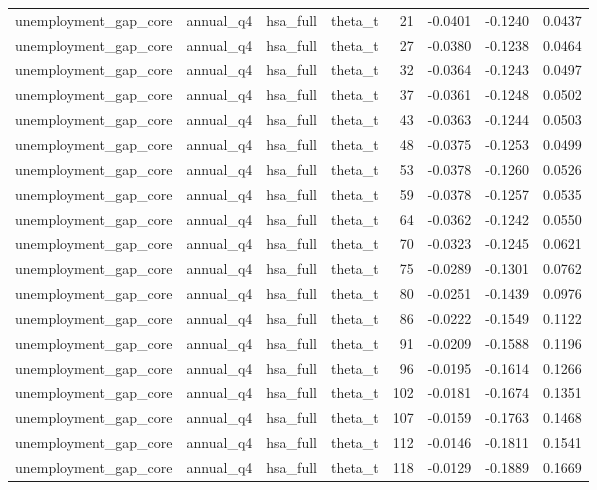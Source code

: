 \begin{tabular}{llllrrrr}
unemployment\_gap\_core & annual\_q4 & hsa\_full & theta\_t & 21 & -0.0401 & -0.1240 & 0.0437 \\
unemployment\_gap\_core & annual\_q4 & hsa\_full & theta\_t & 27 & -0.0380 & -0.1238 & 0.0464 \\
unemployment\_gap\_core & annual\_q4 & hsa\_full & theta\_t & 32 & -0.0364 & -0.1243 & 0.0497 \\
unemployment\_gap\_core & annual\_q4 & hsa\_full & theta\_t & 37 & -0.0361 & -0.1248 & 0.0502 \\
unemployment\_gap\_core & annual\_q4 & hsa\_full & theta\_t & 43 & -0.0363 & -0.1244 & 0.0503 \\
unemployment\_gap\_core & annual\_q4 & hsa\_full & theta\_t & 48 & -0.0375 & -0.1253 & 0.0499 \\
unemployment\_gap\_core & annual\_q4 & hsa\_full & theta\_t & 53 & -0.0378 & -0.1260 & 0.0526 \\
unemployment\_gap\_core & annual\_q4 & hsa\_full & theta\_t & 59 & -0.0378 & -0.1257 & 0.0535 \\
unemployment\_gap\_core & annual\_q4 & hsa\_full & theta\_t & 64 & -0.0362 & -0.1242 & 0.0550 \\
unemployment\_gap\_core & annual\_q4 & hsa\_full & theta\_t & 70 & -0.0323 & -0.1245 & 0.0621 \\
unemployment\_gap\_core & annual\_q4 & hsa\_full & theta\_t & 75 & -0.0289 & -0.1301 & 0.0762 \\
unemployment\_gap\_core & annual\_q4 & hsa\_full & theta\_t & 80 & -0.0251 & -0.1439 & 0.0976 \\
unemployment\_gap\_core & annual\_q4 & hsa\_full & theta\_t & 86 & -0.0222 & -0.1549 & 0.1122 \\
unemployment\_gap\_core & annual\_q4 & hsa\_full & theta\_t & 91 & -0.0209 & -0.1588 & 0.1196 \\
unemployment\_gap\_core & annual\_q4 & hsa\_full & theta\_t & 96 & -0.0195 & -0.1614 & 0.1266 \\
unemployment\_gap\_core & annual\_q4 & hsa\_full & theta\_t & 102 & -0.0181 & -0.1674 & 0.1351 \\
unemployment\_gap\_core & annual\_q4 & hsa\_full & theta\_t & 107 & -0.0159 & -0.1763 & 0.1468 \\
unemployment\_gap\_core & annual\_q4 & hsa\_full & theta\_t & 112 & -0.0146 & -0.1811 & 0.1541 \\
unemployment\_gap\_core & annual\_q4 & hsa\_full & theta\_t & 118 & -0.0129 & -0.1889 & 0.1669 \\

\end{tabular}
